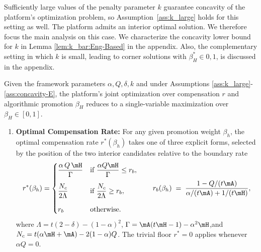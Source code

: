 Sufficiently large values of the penalty parameter $k$ guarantee concavity of the platform's optimization problem, so Assumption~\ref{ass:k_large} holds for this setting as well. The platform admits an interior optimal solution. We therefore focus the main analysis on this case. We characterize the concavity lower bound for $k$ in Lemma \ref{lem:k_bar:Eng-Based} in the appendix. Also, the complementary setting in which $k$ is small, leading to corner solutions with $\beta_H^* \in {0,1}$, is discussed in the appendix.



\begin{proposition}\label{prop:optimal:r_beta:Eng-Based}
Given the framework parameters $\alpha, Q, \delta, k$ and under Assumptions \ref{ass:k_large}-\ref{ass:concavity-E}, the platform's joint optimization over compensation $r$ and algorithmic promotion $\beta_H$ reduces to a single-variable maximization over $\beta_H \in [0,1]$. 

\begin{enumerate}
    \item \textbf{Optimal Compensation Rate:} For any given promotion weight $\beta_h$, the optimal compensation rate $r^*(\beta_h)$ takes one of three explicit forms, selected by the position of the two interior candidates relative to the boundary rate
    \[
        r^*(\beta_h) =
        \begin{cases}
            \displaystyle \frac{\alpha\,Q\,\mH}{\Gamma} & \text{if } \dfrac{\alpha Q\mH}{\Gamma} \le r_b, \\[12pt]
            \displaystyle \frac{N_c}{2\Lambda} & \text{if } \dfrac{N_c}{2\Lambda} \ge r_b, \\[12pt]
            \displaystyle r_b & \text{otherwise.}
        \end{cases} \qquad r_b(\beta_h) \;=\; \frac{1 - Q/(t\mA)}{\alpha/(t\mA) + 1/(t\mH)},
    \]
    where $\Lambda=t(2-\delta)-(1-\alpha)^{2}$, $\Gamma=\mA(t\mH-1)-\alpha^{2}\mH$,and $N_c = t(\alpha\mH + \mA) - 2(1-\alpha)Q$.
    The trivial floor $r^* = 0$ applies whenever $\alpha Q = 0$.
    

\end{enumerate}
\end{proposition}
